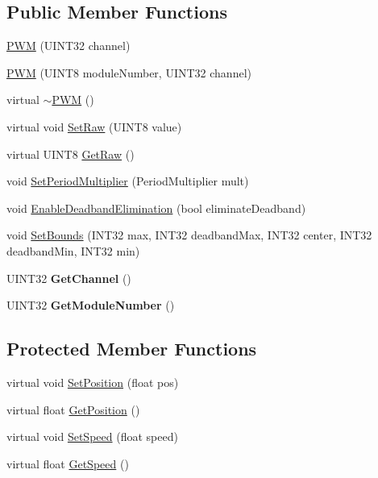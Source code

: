 \subsection*{Public Member Functions}
\begin{DoxyCompactItemize}
\item 
\hyperlink{classPWM_aa96fde4003a2ee8c57f90019b2504009}{PWM} (UINT32 channel)
\item 
\hyperlink{classPWM_ac881a7f77ff1989debafd76005868d77}{PWM} (UINT8 moduleNumber, UINT32 channel)
\item 
virtual \hyperlink{classPWM_a903377c1da3618530f999d77297406af}{$\sim$PWM} ()
\item 
virtual void \hyperlink{classPWM_ae0916ef0dec0ad1e7793a16d3d6c42c3}{SetRaw} (UINT8 value)
\item 
virtual UINT8 \hyperlink{classPWM_a4fe28ee13017aa4c6b9b8fa662ebf99e}{GetRaw} ()
\item 
void \hyperlink{classPWM_a274fbac1ce527d1b08fab2ef4d66c35b}{SetPeriodMultiplier} (PeriodMultiplier mult)
\item 
void \hyperlink{classPWM_a9e3edb95ce8aefe94e2d0827798e62a1}{EnableDeadbandElimination} (bool eliminateDeadband)
\item 
void \hyperlink{classPWM_a57047fe0445577e94cebad0aa96165be}{SetBounds} (INT32 max, INT32 deadbandMax, INT32 center, INT32 deadbandMin, INT32 min)
\item 
\hypertarget{classPWM_a4cf5a893891d8fab4cafcecdd74516cb}{
UINT32 {\bfseries GetChannel} ()}
\label{classPWM_a4cf5a893891d8fab4cafcecdd74516cb}

\item 
\hypertarget{classPWM_a9dee53892735abde221e465882cf74c0}{
UINT32 {\bfseries GetModuleNumber} ()}
\label{classPWM_a9dee53892735abde221e465882cf74c0}

\end{DoxyCompactItemize}
\subsection*{Protected Member Functions}
\begin{DoxyCompactItemize}
\item 
virtual void \hyperlink{classPWM_a93e43862c48e9a06d95bd916b77c183a}{SetPosition} (float pos)
\item 
virtual float \hyperlink{classPWM_a2f5dcbf84dc82c4b19098c4cc99d0390}{GetPosition} ()
\item 
virtual void \hyperlink{classPWM_a947e5f6073da9e4d1b60db0c7791ca9c}{SetSpeed} (float speed)
\item 
virtual float \hyperlink{classPWM_a42b209cbe7e63732918cbbcb55bfaac7}{GetSpeed} ()
\end{DoxyCompactItemize}

